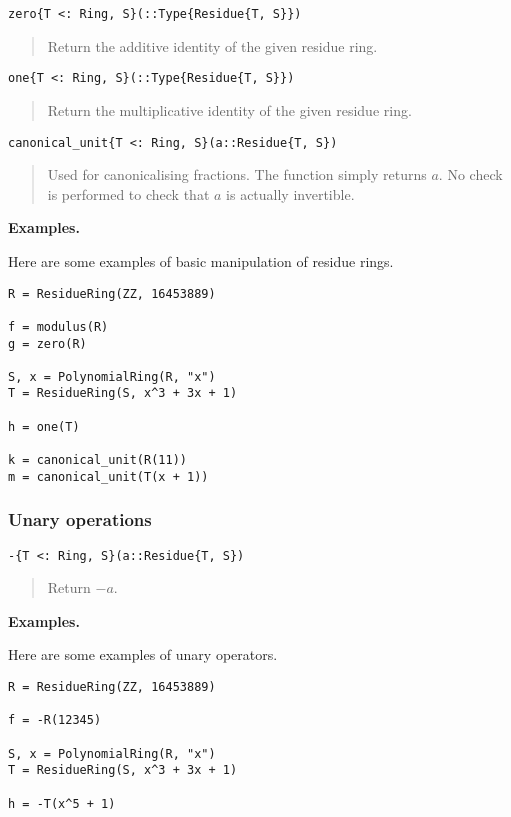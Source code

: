 \documentclass[a4paper,10pt]{article}
\newcommand{\desc}[1]{\vspace{-3mm}\begin{quote}#1\end{quote}}
\begin{document}
{{{\begin{lstlisting}
zero{T <: Ring, S}(::Type{Residue{T, S}})
\end{lstlisting}

\desc{Return the additive identity of the given residue ring.}

\begin{lstlisting}
one{T <: Ring, S}(::Type{Residue{T, S}})
\end{lstlisting}

\desc{Return the multiplicative identity of the given residue ring.}

\begin{lstlisting}
canonical_unit{T <: Ring, S}(a::Residue{T, S})
\end{lstlisting}

\desc{Used for canonicalising fractions. The function simply returns $a$. No
check is performed to check that $a$ is actually invertible.}

\textbf{Examples.}

Here are some examples of basic manipulation of residue rings.

\begin{lstlisting}
R = ResidueRing(ZZ, 16453889)

f = modulus(R)
g = zero(R)

S, x = PolynomialRing(R, "x")
T = ResidueRing(S, x^3 + 3x + 1)

h = one(T)

k = canonical_unit(R(11))
m = canonical_unit(T(x + 1))
\end{lstlisting}

\subsubsection{Unary operations}

\begin{lstlisting}
-{T <: Ring, S}(a::Residue{T, S})
\end{lstlisting}

\desc{Return $-a$.}

\textbf{Examples.}

Here are some examples of unary operators.

\begin{lstlisting}
R = ResidueRing(ZZ, 16453889)

f = -R(12345)

S, x = PolynomialRing(R, "x")
T = ResidueRing(S, x^3 + 3x + 1)

h = -T(x^5 + 1)
\end{lstlisting}

}}}
\end{document}

